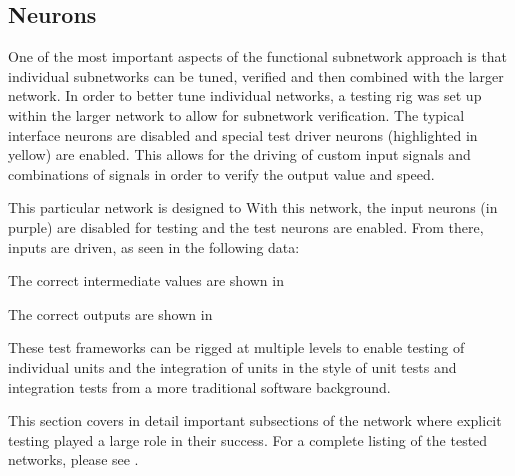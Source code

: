 \subsection{Neurons}

One of the most important aspects of the functional subnetwork approach is that
individual subnetworks can be tuned, verified and then combined with the larger
network. In order to better tune individual networks, a testing rig was set up
within the larger network to allow for subnetwork verification. The typical
interface neurons are disabled and special test driver neurons (highlighted in
yellow) are enabled. This allows for the driving of custom input signals and
combinations of signals in order to verify the output value and speed.


This particular network is designed to %
With this network, the input neurons (in purple) %
are disabled for testing and the test neurons are enabled. From there, inputs
are driven, as seen in the following data:


The correct intermediate values are shown in

The correct outputs are shown in %


These test frameworks can be rigged at multiple levels to enable testing of
individual units and the integration of units in the style of unit tests and
integration tests from a more traditional software background.



This section covers in detail important subsections of the network where
explicit testing played a large role in their success. For a complete listing of
the tested networks, please see .
